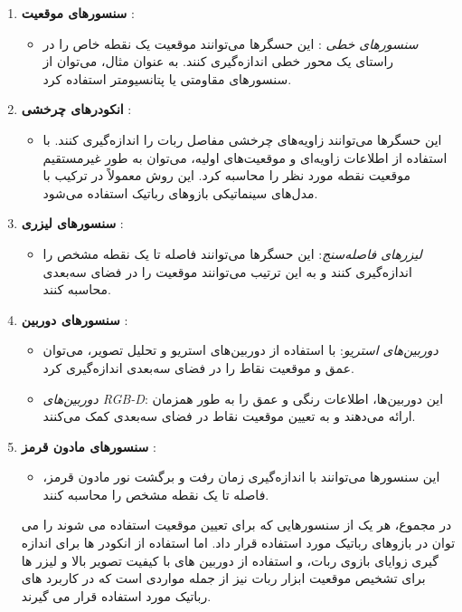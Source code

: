 \begin{enumerate}
	\item \textbf{سنسورهای موقعیت }:
	\begin{itemize}
		\item \textit{سنسورهای خطی }: این حسگرها می‌توانند موقعیت یک نقطه خاص را در راستای یک محور خطی اندازه‌گیری کنند. به عنوان مثال، می‌توان از سنسورهای مقاومتی یا پتانسیومتر استفاده کرد.
	\end{itemize}
	
	\item \textbf{انکودرهای چرخشی }:
	\begin{itemize}
		\item این حسگرها می‌توانند زاویه‌های چرخشی مفاصل ربات را اندازه‌گیری کنند. با استفاده از اطلاعات زاویه‌ای و موقعیت‌های اولیه، می‌توان به طور غیرمستقیم موقعیت نقطه مورد نظر را محاسبه کرد. این روش معمولاً در ترکیب با مدل‌های سینماتیکی بازوهای رباتیک استفاده می‌شود.
	\end{itemize}
	
	\item \textbf{سنسورهای لیزری }:
	\begin{itemize}
		\item \textit{لیزرهای فاصله‌سنج}: این حسگرها می‌توانند فاصله تا یک نقطه مشخص را اندازه‌گیری کنند و به این ترتیب می‌توانند موقعیت را در فضای سه‌بعدی محاسبه کنند.
	\end{itemize}
	
	\item \textbf{سنسورهای دوربین }:
	\begin{itemize}
		\item \textit{دوربین‌های استریو}: با استفاده از دوربین‌های استریو و تحلیل تصویر، می‌توان عمق و موقعیت نقاط را در فضای سه‌بعدی اندازه‌گیری کرد.
		\item \textit{دوربین‌های RGB-D}: این دوربین‌ها، اطلاعات رنگی و عمق را به طور همزمان ارائه می‌دهند و به تعیین موقعیت نقاط در فضای سه‌بعدی کمک می‌کنند.
	\end{itemize}
	
	\item \textbf{سنسورهای مادون قرمز }:
	\begin{itemize}
		\item این سنسورها می‌توانند با اندازه‌گیری زمان رفت و برگشت نور مادون قرمز، فاصله تا یک نقطه مشخص را محاسبه کنند.
	\end{itemize}
	
در مجموع، هر یک از سنسورهایی که برای تعیین موقعیت استفاده می شوند را می توان در بازوهای رباتیک مورد استفاده قرار داد. اما استفاده از انکودر ها برای اندازه گیری زوایای بازوی ربات، و استفاده از دوربین های با کیفیت تصویر بالا و لیزر ها برای تشخیص موقعیت ابزار ربات نیز از جمله مواردی است که در کاربرد های رباتیک مورد استفاده قرار می گیرند.
\end{enumerate}

